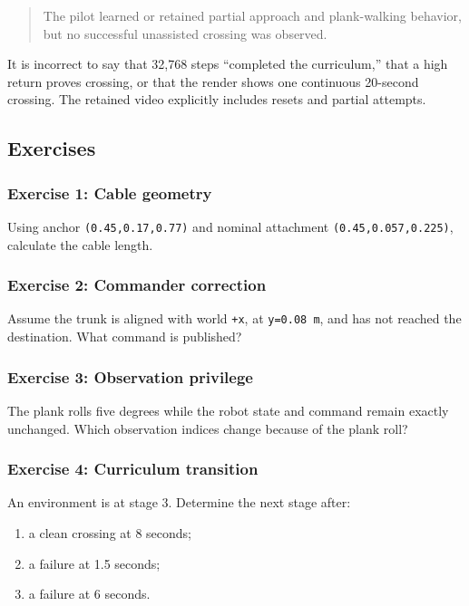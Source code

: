 \documentclass[
  american,
  11pt,
  letterpaper,
]{article}
\providecommand{\tightlist}{%
  \setlength{\itemsep}{0pt}\setlength{\parskip}{0pt}}
\begin{document}
\begin{quote}
The pilot learned or retained partial approach and plank-walking
behavior, but no successful unassisted crossing was observed.
\end{quote}

It is incorrect to say that 32,768 steps ``completed the curriculum,''
that a high return proves crossing, or that the render shows one
continuous 20-second crossing. The retained video explicitly includes
resets and partial attempts.

\subsection{Exercises}\label{exercises-2}

\subsubsection{Exercise 1: Cable
geometry}\label{exercise-1-cable-geometry}

Using anchor \texttt{(0.45,0.17,0.77)} and nominal attachment
\texttt{(0.45,0.057,0.225)}, calculate the cable length.

\subsubsection{Exercise 2: Commander
correction}\label{exercise-2-commander-correction}

Assume the trunk is aligned with world \texttt{+x}, at
\texttt{y=0.08\ m}, and has not reached the destination. What command is
published?

\subsubsection{Exercise 3: Observation
privilege}\label{exercise-3-observation-privilege}

The plank rolls five degrees while the robot state and command remain
exactly unchanged. Which observation indices change because of the plank
roll?

\subsubsection{Exercise 4: Curriculum
transition}\label{exercise-4-curriculum-transition}

An environment is at stage 3. Determine the next stage after:

\begin{enumerate}
\def\labelenumi{\arabic{enumi}.}
\tightlist
\item
  a clean crossing at 8 seconds;
\item
  a failure at 1.5 seconds;
\item
  a failure at 6 seconds.
\end{enumerate}
\end{document}
